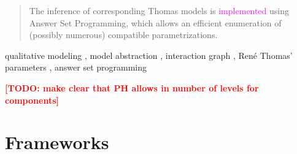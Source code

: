 \documentclass[preprint]{elsarticle}
\newcommand{\todo}[1]{\textcolor{red}{\textbf{[TODO: #1]}}}
\def\modLP#1{\textcolor{magenta}{#1}}
\begin{document}
\begin{frontmatter}
\begin{abstract}
The inference of corresponding Thomas models is \modLP{implemented} using Answer Set Programming,
which allows an efficient enumeration of (possibly numerous) compatible parametrizations.
\end{abstract}

\begin{keyword}
qualitative modeling \sep
model abstraction \sep
interaction graph \sep
René Thomas' parameters \sep
answer set programming
\end{keyword}

\end{frontmatter}


\todo{make clear that PH allows in number of levels for components}



\section{Frameworks}\label{sec:frameworks}














%
\end{document}
